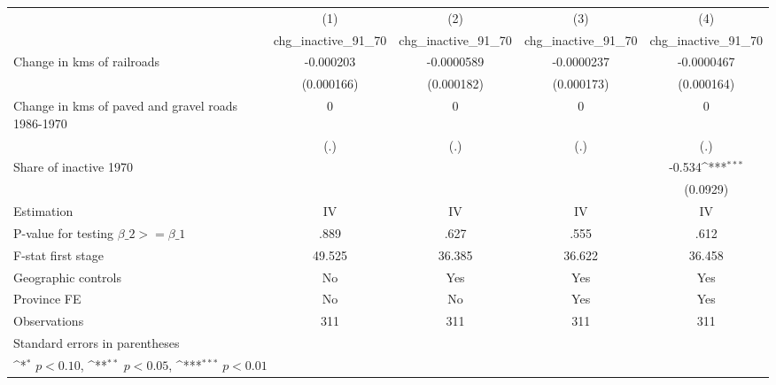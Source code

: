 {
\def\sym#1{\ifmmode^{#1}\else\(^{#1}\)\fi}
\begin{tabular}{l*{4}{c}}
\hline\hline
                &\multicolumn{1}{c}{(1)}&\multicolumn{1}{c}{(2)}&\multicolumn{1}{c}{(3)}&\multicolumn{1}{c}{(4)}\\
                &\multicolumn{1}{c}{chg\_inactive\_91\_70}&\multicolumn{1}{c}{chg\_inactive\_91\_70}&\multicolumn{1}{c}{chg\_inactive\_91\_70}&\multicolumn{1}{c}{chg\_inactive\_91\_70}\\
\hline
Change in kms of railroads&-0.000203         &-0.0000589         &-0.0000237         &-0.0000467         \\
                &(0.000166)         &(0.000182)         &(0.000173)         &(0.000164)         \\
[1em]
Change in kms of paved and gravel roads 1986-1970&        0         &        0         &        0         &        0         \\
                &      (.)         &      (.)         &      (.)         &      (.)         \\
[1em]
Share of inactive 1970&                  &                  &                  &   -0.534\sym{***}\\
                &                  &                  &                  & (0.0929)         \\
\hline
Estimation      &       IV         &       IV         &       IV         &       IV         \\
P-value for testing $\beta\_2 >= \beta\_1$&     .889         &     .627         &     .555         &     .612         \\
F-stat first stage&   49.525         &   36.385         &   36.622         &   36.458         \\
Geographic controls&       No         &      Yes         &      Yes         &      Yes         \\
Province FE     &       No         &       No         &      Yes         &      Yes         \\
Observations    &      311         &      311         &      311         &      311         \\
\hline\hline
\multicolumn{5}{l}{\footnotesize Standard errors in parentheses}\\
\multicolumn{5}{l}{\footnotesize \sym{*} \(p<0.10\), \sym{**} \(p<0.05\), \sym{***} \(p<0.01\)}\\
\end{tabular}
}
